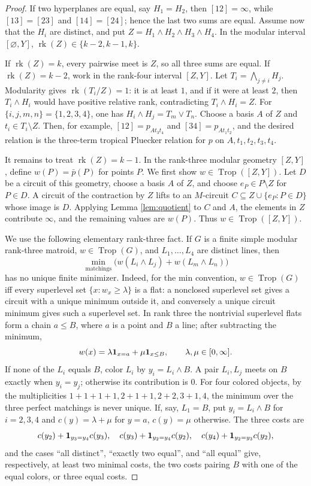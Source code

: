 \documentclass[12pt]{article}
\theoremstyle{definition}
\newcommand{\Trop}{\operatorname{Trop}}
\newcommand{\rk}{\operatorname{rk}}
\begin{document}
\begin{proof}
If two hyperplanes are equal, say \(H_1=H_2\), then \([12]=\infty\), while \([13]=[23]\) and \([14]=[24]\); hence the last two sums are equal.  Assume now that the \(H_i\) are distinct, and put \(Z=H_1\wedge H_2\wedge H_3\wedge H_4\).  In the modular interval \([\varnothing,Y]\), \(\rk(Z)\in\{k-2,k-1,k\}\).

If \(\rk(Z)=k\), every pairwise meet is \(Z\), so all three sums are equal.  If \(\rk(Z)=k-2\), work in the rank-four interval \([Z,Y]\).  Let \(T_i=\bigwedge_{j\ne i}H_j\).  Modularity gives \(\rk(T_i/Z)=1\): it is at least \(1\), and if it were at least \(2\), then \(T_i\wedge H_i\) would have positive relative rank, contradicting \(T_i\wedge H_i=Z\).  For \(\{i,j,m,n\}=\{1,2,3,4\}\), one has \(H_i\wedge H_j=T_m\vee T_n\).  Choose a basis \(A\) of \(Z\) and \(t_i\in T_i\setminus Z\).  Then, for example, \([12]=p_{A t_3t_4}\) and \([34]=p_{A t_1t_2}\), and the desired relation is the three-term tropical Pluecker relation for \(p\) on \(A,t_1,t_2,t_3,t_4\).

It remains to treat \(\rk(Z)=k-1\).  In the rank-three modular geometry \([Z,Y]\), define \(w(P)=\bar p(P)\) for points \(P\).  We first show \(w\in\Trop([Z,Y])\).  Let \(D\) be a circuit of this geometry, choose a basis \(A\) of \(Z\), and choose \(e_P\in P\setminus Z\) for \(P\in D\).  A circuit of the contraction by \(Z\) lifts to an \(M\)-circuit \(C\subseteq Z\cup\{e_P:P\in D\}\) whose image is \(D\).  Applying Lemma \ref{lem:quotient} to \(C\) and \(A\), the elements in \(Z\) contribute \(\infty\), and the remaining values are \(w(P)\).  Thus \(w\in\Trop([Z,Y])\).

We use the following elementary rank-three fact.  If \(G\) is a finite simple modular rank-three matroid, \(w\in\Trop(G)\), and \(L_1,\ldots,L_4\) are distinct lines, then
\[
\min_{\text{matchings}}
\bigl(w(L_i\wedge L_j)+w(L_m\wedge L_n)\bigr)
\]
has no unique finite minimizer.  Indeed, for the min convention, \(w\in\Trop(G)\) iff every superlevel set \(\{x:w_x\ge\lambda\}\) is a flat: a nonclosed superlevel set gives a circuit with a unique minimum outside it, and conversely a unique circuit minimum gives such a superlevel set.  In rank three the nontrivial superlevel flats form a chain \(a\le B\), where \(a\) is a point and \(B\) a line; after subtracting the minimum,
\[
w(x)=\lambda{\bf 1}_{x=a}+\mu{\bf 1}_{x\le B},\qquad \lambda,\mu\in[0,\infty].
\]
If none of the \(L_i\) equals \(B\), color \(L_i\) by \(y_i=L_i\wedge B\).  A pair \(L_i,L_j\) meets on \(B\) exactly when \(y_i=y_j\); otherwise its contribution is \(0\).  For four colored objects, by the multiplicities \(1+1+1+1,2+1+1,2+2,3+1,4\), the minimum over the three perfect matchings is never unique.  If, say, \(L_1=B\), put \(y_i=L_i\wedge B\) for \(i=2,3,4\) and \(c(y)=\lambda+\mu\) for \(y=a\), \(c(y)=\mu\) otherwise.  The three costs are
\[
c(y_2)+{\bf 1}_{y_3=y_4}c(y_3),\quad
c(y_3)+{\bf 1}_{y_2=y_4}c(y_2),\quad
c(y_4)+{\bf 1}_{y_2=y_3}c(y_2),
\]
and the cases ``all distinct'', ``exactly two equal'', and ``all equal'' give, respectively, at least two minimal costs, the two costs pairing \(B\) with one of the equal colors, or three equal costs.


\end{proof}
\end{document}
